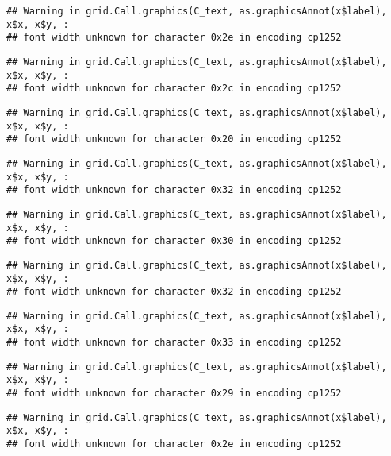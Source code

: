 \documentclass[
]{article}
\begin{document}
\begin{verbatim}
## Warning in grid.Call.graphics(C_text, as.graphicsAnnot(x$label), x$x, x$y, :
## font width unknown for character 0x2e in encoding cp1252
\end{verbatim}

\begin{verbatim}
## Warning in grid.Call.graphics(C_text, as.graphicsAnnot(x$label), x$x, x$y, :
## font width unknown for character 0x2c in encoding cp1252
\end{verbatim}

\begin{verbatim}
## Warning in grid.Call.graphics(C_text, as.graphicsAnnot(x$label), x$x, x$y, :
## font width unknown for character 0x20 in encoding cp1252
\end{verbatim}

\begin{verbatim}
## Warning in grid.Call.graphics(C_text, as.graphicsAnnot(x$label), x$x, x$y, :
## font width unknown for character 0x32 in encoding cp1252
\end{verbatim}

\begin{verbatim}
## Warning in grid.Call.graphics(C_text, as.graphicsAnnot(x$label), x$x, x$y, :
## font width unknown for character 0x30 in encoding cp1252
\end{verbatim}

\begin{verbatim}
## Warning in grid.Call.graphics(C_text, as.graphicsAnnot(x$label), x$x, x$y, :
## font width unknown for character 0x32 in encoding cp1252
\end{verbatim}

\begin{verbatim}
## Warning in grid.Call.graphics(C_text, as.graphicsAnnot(x$label), x$x, x$y, :
## font width unknown for character 0x33 in encoding cp1252
\end{verbatim}

\begin{verbatim}
## Warning in grid.Call.graphics(C_text, as.graphicsAnnot(x$label), x$x, x$y, :
## font width unknown for character 0x29 in encoding cp1252
\end{verbatim}

\begin{verbatim}
## Warning in grid.Call.graphics(C_text, as.graphicsAnnot(x$label), x$x, x$y, :
## font width unknown for character 0x2e in encoding cp1252
\end{verbatim}
\end{document}
